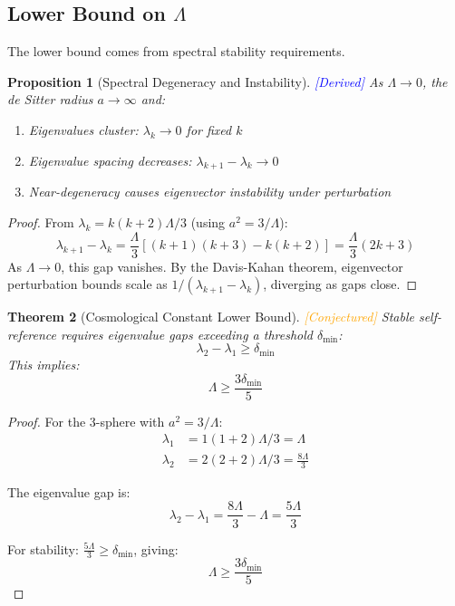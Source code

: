 \documentclass[11pt,a4paper]{article}
\theoremstyle{plain}
\newtheorem{theorem}{Theorem}[section]
\newtheorem{proposition}[theorem]{Proposition}
\theoremstyle{definition}
\theoremstyle{remark}
\newcommand{\derived}{\textcolor{blue}{[Derived]}}
\newcommand{\conjectured}{\textcolor{orange}{[Conjectured]}}
\begin{document}
\subsection{Lower Bound on $\Lambda$}

The lower bound comes from spectral stability requirements.

\begin{proposition}[Spectral Degeneracy and Instability] \derived
\label{prop:degeneracy}
As $\Lambda \to 0$, the de Sitter radius $a \to \infty$ and:
\begin{enumerate}[label=(\roman*),noitemsep]
    \item Eigenvalues cluster: $\lambda_k \to 0$ for fixed $k$
    \item Eigenvalue spacing decreases: $\lambda_{k+1} - \lambda_k \to 0$
    \item Near-degeneracy causes eigenvector instability under perturbation
\end{enumerate}
\end{proposition}

\begin{proof}
From $\lambda_k = k(k+2)\Lambda/3$ (using $a^2 = 3/\Lambda$):
\[
\lambda_{k+1} - \lambda_k = \frac{\Lambda}{3}[(k+1)(k+3) - k(k+2)] = \frac{\Lambda}{3}(2k + 3)
\]
As $\Lambda \to 0$, this gap vanishes. By the Davis-Kahan theorem, eigenvector perturbation bounds scale as $1/(\lambda_{k+1} - \lambda_k)$, diverging as gaps close.
\end{proof}

\begin{theorem}[Cosmological Constant Lower Bound] \conjectured
\label{thm:lower_bound}
Stable self-reference requires eigenvalue gaps exceeding a threshold $\delta_{\min}$:
\[
\lambda_2 - \lambda_1 \geq \delta_{\min}
\]
This implies:
\[
\Lambda \geq \frac{3\delta_{\min}}{5}
\]
\end{theorem}

\begin{proof}
For the 3-sphere with $a^2 = 3/\Lambda$:
\begin{align}
\lambda_1 &= 1(1+2)\Lambda/3 = \Lambda \\
\lambda_2 &= 2(2+2)\Lambda/3 = \frac{8\Lambda}{3}
\end{align}

The eigenvalue gap is:
\[
\lambda_2 - \lambda_1 = \frac{8\Lambda}{3} - \Lambda = \frac{5\Lambda}{3}
\]

For stability: $\frac{5\Lambda}{3} \geq \delta_{\min}$, giving:
\[
\Lambda \geq \frac{3\delta_{\min}}{5}
\]
\end{proof}
\end{document}
